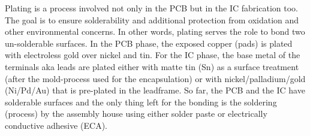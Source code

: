 \documentclass[final]{cubedoc}
\begin{document}










Plating is a process involved not only in the PCB but in the IC fabrication too. The goal is to ensure solderability and additional protection from oxidation and other environmental concerns. In other words, plating serves the role to bond two un-solderable surfaces. In the PCB phase, the exposed copper (pads) is plated with electroless gold over nickel and tin. For the IC phase, the base metal of the terminals aka leads are plated either with matte tin (Sn) as a surface treatment (after the mold-process used for the encapsulation) or with  nickel/palladium/gold (Ni/Pd/Au) that is pre-plated in the leadframe. So far, the PCB and the IC have solderable surfaces and the only thing left for the bonding is the soldering (process) by the assembly house using either solder paste or electrically conductive adhesive (ECA).  
\end{document}
